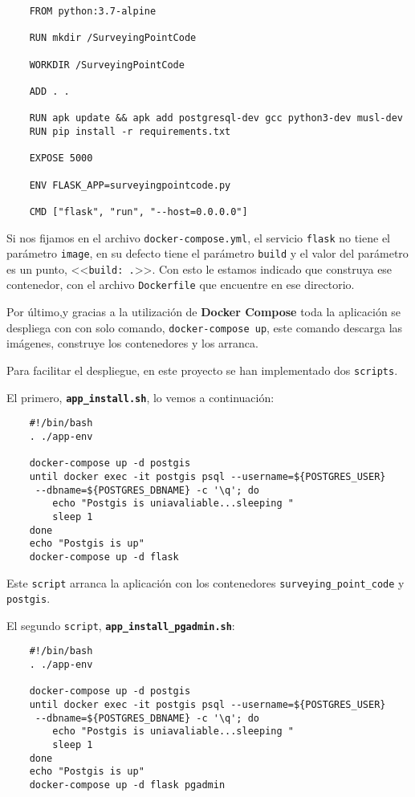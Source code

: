 \begin{verbatim}
	FROM python:3.7-alpine

	RUN mkdir /SurveyingPointCode

	WORKDIR /SurveyingPointCode

	ADD . .

	RUN apk update && apk add postgresql-dev gcc python3-dev musl-dev
	RUN pip install -r requirements.txt
	
	EXPOSE 5000

	ENV FLASK_APP=surveyingpointcode.py

	CMD ["flask", "run", "--host=0.0.0.0"] 
\end{verbatim}

Si nos fijamos en el archivo \texttt{docker-compose.yml}, el servicio \texttt{flask} no tiene el parámetro \texttt{image}, en su defecto tiene el parámetro  \texttt{build} y el valor del parámetro es un punto, <<\texttt{build: .}>>. Con esto le estamos indicado que construya ese contenedor, con el archivo \texttt{Dockerfile} que encuentre en ese directorio.

Por último,y gracias a la utilización de \textbf{Docker Compose} toda la aplicación se despliega con con solo comando, \texttt{docker-compose up}, este comando descarga las imágenes, construye los contenedores y los arranca.

Para facilitar el despliegue, en este proyecto se han implementado dos \texttt{scripts}.

El primero, \textbf{\texttt{app\_install.sh}}, lo vemos a continuación:
\begin{verbatim}
	#!/bin/bash
	. ./app-env

	docker-compose up -d postgis
	until docker exec -it postgis psql --username=${POSTGRES_USER}
	 --dbname=${POSTGRES_DBNAME} -c '\q'; do
		echo "Postgis is uniavaliable...sleeping "
		sleep 1
	done
	echo "Postgis is up"
	docker-compose up -d flask
\end{verbatim}

Este \texttt{script} arranca la aplicación con los contenedores \texttt{surveying\_point\_code} y \texttt{postgis}.

El segundo \texttt{script}, \textbf{\texttt{app\_install\_pgadmin.sh}}:

\begin{verbatim}
	#!/bin/bash
	. ./app-env

	docker-compose up -d postgis
	until docker exec -it postgis psql --username=${POSTGRES_USER}
	 --dbname=${POSTGRES_DBNAME} -c '\q'; do
		echo "Postgis is uniavaliable...sleeping "
		sleep 1
	done
	echo "Postgis is up"
	docker-compose up -d flask pgadmin
\end{verbatim}

